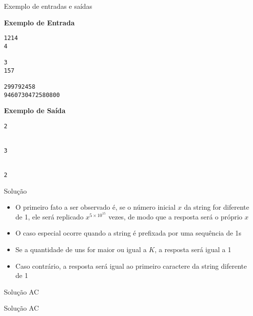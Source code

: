 \begin{frame}[fragile]{Exemplo de entradas e saídas}

\begin{minipage}[t]{0.5\textwidth}
\textbf{Exemplo de Entrada}
\begin{verbatim}
1214
4

3
157

299792458
9460730472580800
\end{verbatim}
\end{minipage}
\begin{minipage}[t]{0.45\textwidth}
\textbf{Exemplo de Saída}
\begin{verbatim}
2


3


2
\end{verbatim}
\end{minipage}
\end{frame}

\begin{frame}[fragile]{Solução}

    \begin{itemize}
        \item O primeiro fato a ser observado é, se o número inicial $x$ da string for diferente de 
        1, ele será replicado $x^{5\times 10^{15}}$ vezes, de modo que a resposta será o próprio $x$

        \item O caso especial ocorre quando a string é prefixada por uma sequência de 1s

        \item Se a quantidade de uns for maior ou igual a $K$, a resposta será igual a 1

        \item Caso contrário, a resposta será igual ao primeiro caractere da string diferente de
            1
    \end{itemize}

\end{frame}

\begin{frame}[fragile]{Solução AC}
\end{frame}

\begin{frame}[fragile]{Solução AC}
\end{frame}
